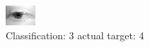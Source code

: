 \begin{figure}[h!]
\begin{center}
\includegraphics[width=0.60\columnwidth]{figures/ID2625_class_3_target_4.png}
\end{center}
\caption{ Classification: 3 actual target: 4}
\label{fig:ID2625_class_3_target_4}
\end{figure}
